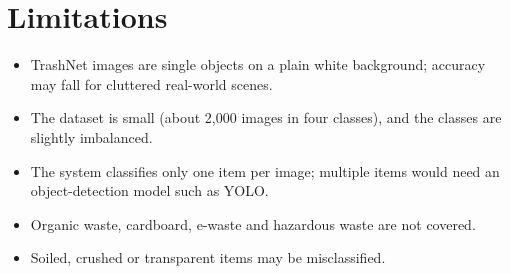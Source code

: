 \section{Limitations}
\begin{itemize}
  \item TrashNet images are single objects on a plain white background; accuracy may fall for cluttered real-world scenes.
  \item The dataset is small (about 2,000 images in four classes), and the classes are slightly imbalanced.
  \item The system classifies only one item per image; multiple items would need an object-detection model such as YOLO.
  \item Organic waste, cardboard, e-waste and hazardous waste are not covered.
  \item Soiled, crushed or transparent items may be misclassified.
\end{itemize}
